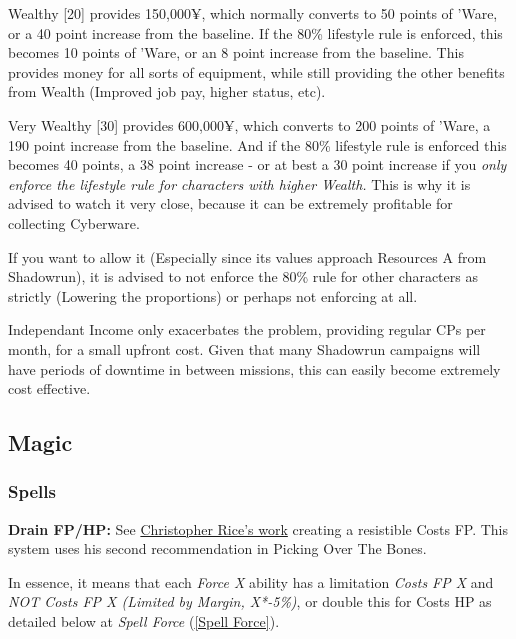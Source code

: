 \begin{multicols*}{2}
	Wealthy [20] provides 150,000¥, which normally converts to 50 points of 'Ware, or a 40 point increase from the baseline. If the 80\% lifestyle rule is enforced, this becomes 10 points of 'Ware, or an 8 point increase from the baseline. This provides money for all sorts of equipment, while still providing the other benefits from Wealth (Improved job pay, higher status, etc).
	
	Very Wealthy [30] provides 600,000¥, which converts to 200 points of 'Ware, a 190 point increase from the baseline. And if the 80\% lifestyle rule is enforced this becomes 40 points, a 38 point increase - or at best a 30 point increase if you \textit{only enforce the lifestyle rule for characters with higher Wealth.} This is why it is advised to watch it very close, because it can be extremely profitable for collecting Cyberware. 
	
	If you want to allow it (Especially since its values approach Resources A from Shadowrun), it is advised to not enforce the 80\% rule for other characters as strictly (Lowering the proportions) or perhaps not enforcing at all.
	
	Independant Income only exacerbates the problem, providing regular CPs per month, for a small upfront cost. Given that many Shadowrun campaigns will have periods of downtime in between missions, this can easily become extremely cost effective.
	
	\subsection{Magic}
	
	\subsubsection{Spells}
	
	\textbf{Drain FP/HP:}
	See \textcolor{Blue}{\href{https://www.ravensnpennies.com/gurps101-fp-cost-limited-by-margin/}{Christopher Rice's work}} creating a resistible Costs FP. This system uses his second recommendation in Picking Over The Bones.
	
	In essence, it means that each \textit{Force X} ability has a limitation \textit{Costs FP X} and \textit{NOT Costs FP X (Limited by Margin, X*-5\%)}, or double this for Costs HP as detailed below at \textit{Spell Force} (\ref{Spell Force}).
	

\end{multicols*}

